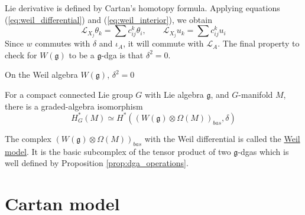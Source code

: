 Lie derivative is defined by Cartan's homotopy formula. 
Applying equations (\ref{eq:weil_differential}) and (\ref{eq:weil_interior}), we
obtain 
\begin{equation} \label{eq:weil_lie}
\mathcal{L}_{X_j} \theta_k = \sum c_{ij}^k \theta_i , \qquad
\mathcal{L}_{X_j}u_k = \sum c_{ij}^k u_i
\end{equation}
Since  $w$ commutes with
 $\delta$ and  $\iota_A$, it will commute with  $\mathcal{L}_A$.
The final property to check for $W(\mathfrak{g})$ to be a  $\mathfrak{g}$-dga
is that  $\delta^2 = 0$. 
\begin{thm} %
	On the Weil algebra $W(\mathfrak{g})$, $\delta^2=0$
\end{thm}


\begin{thm} \label{thm:equivariant_de_Rham} %
	For a compact connected Lie group $G$ with Lie algebra $\mathfrak{g}$, and
	$G$-manifold  $M$, there is a graded-algebra isomorphism 
	 \[
		 H_G^*(M) \simeq H^*((W(\mathfrak{g})\otimes \Omega(M))_{bas}, \delta)
	\] 
\end{thm}
\noindent
The complex $(W(\mathfrak{g})\otimes \Omega(M))_{bas}$ with the Weil
differential is called the \underline{Weil model}. It is the basic subcomplex of
the tensor product of two $\mathfrak{g}$-dgas which is well defined by
Proposition \ref{prop:dga_operations}.


\section{Cartan model}

